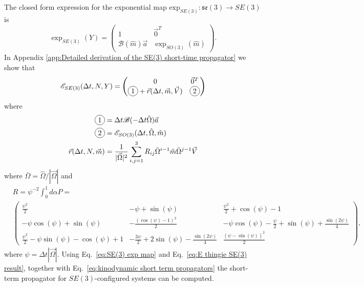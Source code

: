 The closed form expression for the exponential map $\text{exp}_{SE(3)} : \mathfrak{se}(3) \to SE(3)$ is \citep{blancoTutorialSETransformation}
\begin{equation} \label{eq:SE(3) exp map}
	\exp_{SE(3)}(Y) = \begin{pmatrix}
		1 & \vec{0}^T \\
		\mathscr{B}(\hat{m}) \vec{a} & \exp_{SO(3)}(\hat{m})
	\end{pmatrix}.
\end{equation}
In Appendix \ref{app:Detailed derivation of the SE(3) short-time propagator} we show that
\begin{equation} \label{eq:E thingie SE(3) result}
	\mathscr{E}_{SE(3)}(\Delta t, N, Y)  = \begin{pmatrix}
		0 & \vec{0}^T \\
		\circled{1} + \vec{r}(\Delta t, \vec{m}, \vec{V}) & \circled{2}
		\end{pmatrix}
\end{equation}
where
\begin{subequations}
	\begin{align}
		\circled{1} & = \Delta t \mathscr{B}( - \Delta t \hat{\Omega}) \vec{a} \\
		\circled{2} & = \mathscr{E}_{SO(3)}(\Delta t, \hat{\Omega}, \hat{m}) \\
		\vec{r}(\Delta t, N, \vec{m}) & = \frac{1}{|\vec{\Omega}|^2} \sum_{i,j=1}^{3} R_{ij} \bar{\Omega}^{i-1} \hat{m} \bar{\Omega}^{j-1} \vec{V}
	\end{align}
\end{subequations}
where $\bar{\Omega} = \hat{\Omega} / |\vec{\Omega}|$ and
\footnotesize
\begin{equation} \label{eq:geometric integrator R matrix}
\begin{aligned}
	& R = \psi^{-2} \int_0^1 d\alpha P =  \\
	& \begin{pmatrix}
\frac{\psi^{2}}{2} & - \psi + \sin{\left(\psi \right)} & \frac{\psi^{2}}{2} + \cos{\left(\psi \right)} - 1\\
- \psi \cos{\left(\psi \right)} + \sin{\left(\psi \right)} & - \frac{\left(\cos{\left(\psi \right)} - 1\right)^{2}}{2} &
 - \psi \cos{\left(\psi \right)} - \frac{\psi}{2} 
 + \sin{\left(\psi \right)} + \frac{\sin{\left(2 \psi \right)}}{4}  \\
\frac{\psi^{2}}{2} - \psi \sin{\left(\psi \right)} - \cos{\left(\psi \right)} + 1 & - \frac{3 \psi}{2} + 2 \sin{\left(\psi \right)} - \frac{\sin{\left(2 \psi \right)}}{4} & \frac{\left(\psi - \sin{\left(\psi \right)}\right)^{2}}{2}
	\end{pmatrix},
\end{aligned}
\end{equation}
\normalsize
where $\psi = \Delta t |\vec{\Omega}|$. Using Eq.~\ref{eq:SE(3) exp map} and Eq.~\ref{eq:E thingie SE(3) result}, together with Eq.~\ref{eq:kinodynamic short term propagators} the short-term propagator for $SE(3)$-configured systems can be computed.

